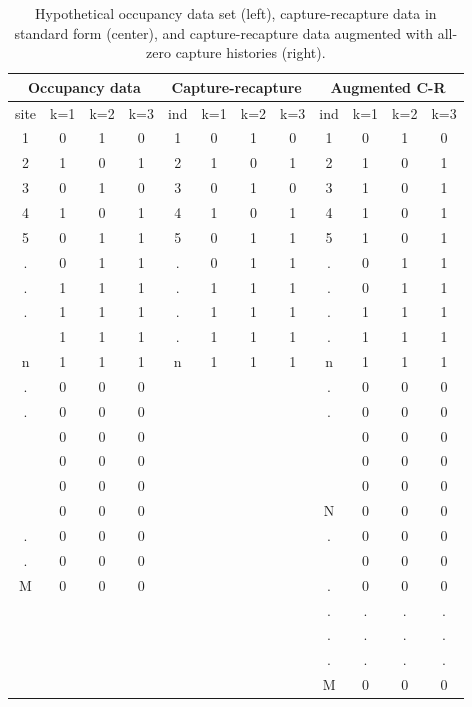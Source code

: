 \begin{table}[ht]
\centering
\caption{Hypothetical occupancy data set (left), capture-recapture data
 in standard form (center), and capture-recapture data augmented with
 all-zero capture histories (right). }
\begin{tabular}{cccc|cccc|cccc}
\hline
\multicolumn{4}{c}{Occupancy data}    &
\multicolumn{4}{c}{Capture-recapture} &
\multicolumn{4}{c}{Augmented C-R}     \\ \hline
site    & k=1 & k=2 & k=3 & ind & k=1 &k=2  & k=3 & ind & k=1 & k=2 & k=3           \\ \hline
1  & 0   & 1   & 0   & 1   & 0   & 1  & 0   & 1   & 0   & 1   & 0                   \\
2  & 1   & 0   & 1   & 2   & 1   & 0 & 1    & 2 & 1 & 0 & 1 \\
3  & 0   & 1   & 0   & 3   & 0   & 1 & 0    & 3 & 1 & 0 & 1 \\
4  & 1   & 0   & 1   & 4   & 1   & 0 & 1    & 4 & 1 & 0 & 1 \\
5  & 0   & 1   & 1   & 5   & 0   & 1 & 1    & 5 & 1 & 0 & 1 \\
.  & 0   & 1   & 1   & .   & 0   & 1 & 1    & . & 0 & 1 & 1 \\
.  & 1   & 1   & 1   & .   & 1   & 1 & 1    & . & 0 & 1 & 1 \\
.  & 1   & 1   & 1   & .   & 1   & 1 & 1    & . & 1 & 1 & 1 \\
   & 1   & 1   & 1   & .   & 1   & 1 & 1    & . & 1 & 1 & 1 \\
n  & 1   & 1   & 1   & n   & 1   & 1 & 1    & n & 1 & 1 & 1 \\
.  & 0   & 0   & 0   &     &     &   &      & . & 0 & 0 & 0 \\
.  & 0   & 0   & 0   &     &     &   &      & . & 0 & 0 & 0 \\
   & 0   & 0   & 0   &     &     &   &      &   & 0 & 0 & 0 \\
   & 0   & 0   & 0   &     &     &   &      &   & 0 & 0 & 0 \\
   & 0   & 0   & 0   &     &     &   &      &   & 0 & 0 & 0 \\
   & 0   & 0   & 0   &     &     &   &      & N & 0 & 0 & 0 \\
.  & 0   & 0   & 0   &     &     &   &      & . & 0 & 0 & 0 \\
.  & 0   & 0   & 0   &     &     &   &      &   & 0 & 0 & 0 \\
M  & 0   & 0   & 0   &     &     &   &      & . & 0 & 0 & 0 \\
   &     &     &     &     &     &   &      & . & . & . & . \\
   &     &     &     &     &     &   &      & . & . & . & . \\
   &     &     &     &     &     &   &      & . & . & . & . \\
   &     &     &     &     &     &   &      & M & 0 & 0 & 0 \\
\hline
\end{tabular}
\label{closed.tab.occ}
\end{table}


